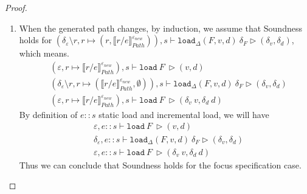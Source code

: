 \documentclass[10pt,twoside,a4paper]{article}
\theoremstyle{theorem}
\theoremstyle{lemma}
\theoremstyle{property}
\theoremstyle{definition}
\theoremstyle{assumption}
\begin{document}
\begin{proof}
\begin{enumerate}
	\item 
	When the generated path changes, by induction, we assume that Soundness holds for $(\delta_\varepsilon \setminus r, r \mapsto (r, \llbracket r/e \rrbracket^{\varepsilon_{new}}_{Path})) , s \vdash \mathtt{load}_\Delta (F,v,d)~ \delta_F \rhd (\delta_v,\delta_d)$, which means.
	\begin{align*}
			& (\varepsilon, r \mapsto \llbracket r/e \rrbracket^{\varepsilon_{new}}_{Path}), s \vdash \mathtt{load}~ F~ \rhd (v,d)\\
			& (\delta_\varepsilon \setminus r, r \mapsto (\llbracket r/e \rrbracket^{\varepsilon_{new}}_{Path}, \emptyset)) , s \vdash \mathtt{load}_\Delta (F,v,d)~ \delta_F \rhd (\delta_v,\delta_d)\\
			& (\varepsilon, r \mapsto \llbracket r/e \rrbracket^{\varepsilon_{new}}_{Path}), s \vdash \mathtt{load}~ F~ \rhd (\delta_v~v,\delta_d~d)
	\end{align*}
	By definition of $e::s$ static load and incremental load, we will have
	\begin{align*}
			& \varepsilon, e::s \vdash \mathtt{load}~ F~ \rhd (v,d)\\
			& \delta_\varepsilon, e::s \vdash \mathtt{load}_\Delta (F,v,d)~ \delta_F \rhd (\delta_v,\delta_d)\\
			& \varepsilon, e::s \vdash \mathtt{load}~ F~ \rhd (\delta_v~v,\delta_d~d)
	\end{align*}
	Thus we can conclude that Soundness holds for the focus specification case.
	\end{enumerate}
	

\end{proof}
\end{document}
